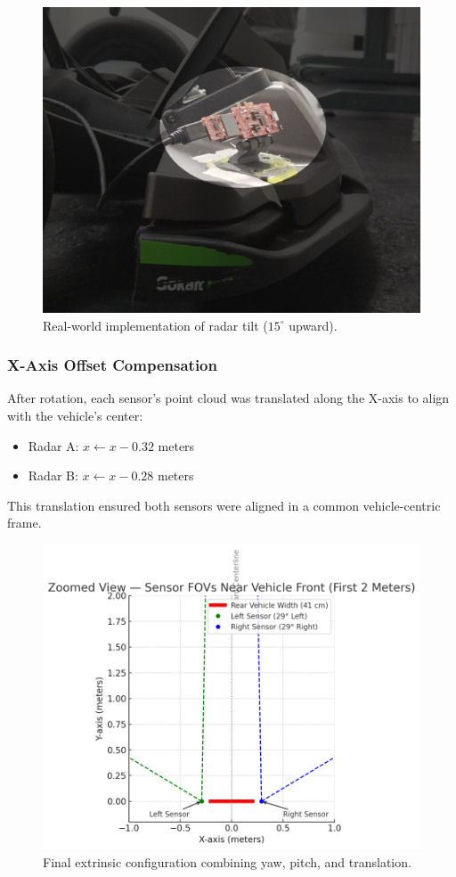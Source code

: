 \begin{figure}[!htbp]
    \centering
    \includegraphics[width=0.8\linewidth]{images/vehicleRadarTiltRotation.png}
    \caption{Real-world implementation of radar tilt ($15^\circ$ upward).}
    \label{fig:vehicleYawTilt}
\end{figure}

\subsubsection{X-Axis Offset Compensation}
After rotation, each sensor's point cloud was translated along the X-axis to align with the vehicle's center:
\begin{itemize}
    \item Radar A: $x \leftarrow x - 0.32$ meters
    \item Radar B: $x \leftarrow x - 0.28$ meters
\end{itemize}

This translation ensured both sensors were aligned in a common vehicle-centric frame.

\begin{figure}[!htbp]
    \centering
    \includegraphics[width=0.8\linewidth]{images/RotationSensor.png}
    \caption{Final extrinsic configuration combining yaw, pitch, and translation.}
    \label{fig:extrinsics}
\end{figure}

